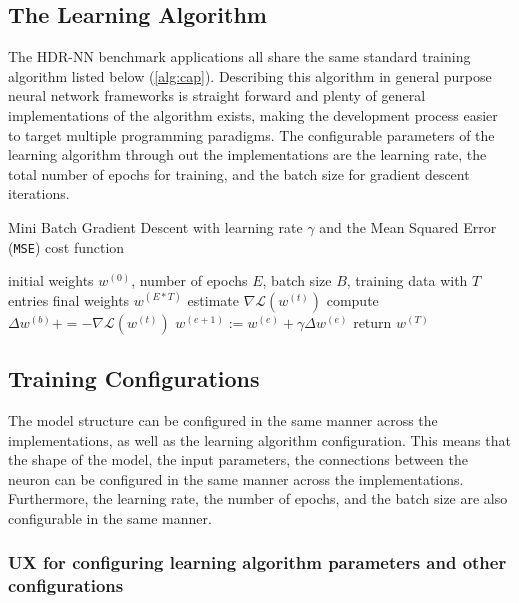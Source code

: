 \subsection{The Learning Algorithm}

The HDR-NN benchmark applications all share the same standard training algorithm listed below (\ref{alg:cap}). Describing this algorithm in general purpose neural network frameworks is straight forward and plenty of general implementations of the algorithm exists, making the development process easier to target multiple programming paradigms. The configurable parameters of the learning algorithm through out the implementations are the learning rate, the total number of epochs for training, and the batch size for gradient descent iterations.

\begin{algorithm}[h]
	\caption{Mini Batch Gradient Descent with learning rate $\gamma$ and the Mean Squared Error (\texttt{MSE}) cost function}
	\label{alg:cap}
	\begin{algorithmic}
	\Require initial weights $w^{(0)}$, number of epochs $E$, batch size $B$, training data with $T$ entries
	\Ensure final weights $w^{(E*T)}$
			\State estimate $\nabla \mathcal{L}(w^{(t)})$ 
			\State compute $\Delta w^{(b)} += - \nabla \mathcal{L}(w^{(t)})$\label{lin:deep-learning-delta-w}
			\EndFor
			\State $w^{(e + 1)} := w^{(e)} + \gamma \Delta w^{(e)}$
		\EndFor
	\EndFor
	\State return $w^{(T)}$
	\end{algorithmic}
\end{algorithm}

\subsection{Training Configurations}

The model structure can be configured in the same manner across the implementations, as well as the learning algorithm configuration. This means that the shape of the model, the input parameters, the connections between the neuron can be configured in the same manner across the implementations. Furthermore, the learning rate, the number of epochs, and the batch size are also configurable in the same manner.

\subsubsection{UX for configuring learning algorithm parameters and other configurations}
\label{section:hdrnn-ux}

